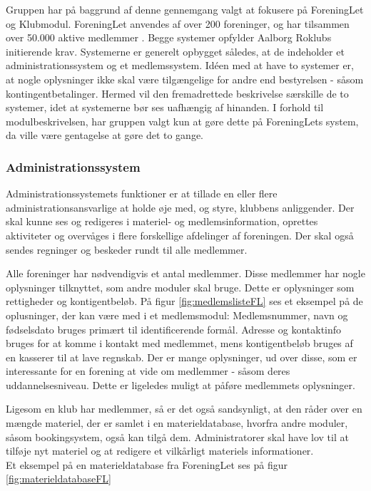 Gruppen har på baggrund af denne gennemgang valgt at fokusere på ForeningLet og Klubmodul. ForeningLet anvendes af over 200 foreninger, og har tilsammen over 50.000 aktive medlemmer \cite{ForeningLet}. Begge systemer opfylder Aalborg Roklubs initierende krav. Systemerne er generelt opbygget således, at de indeholder et administrationssystem og et medlemssystem. Idéen med at have to systemer er, at nogle oplysninger ikke skal være tilgængelige for andre end bestyrelsen - såsom kontingentbetalinger. Hermed vil den fremadrettede beskrivelse særskille de to systemer, idet at systemerne bør ses uafhængig af hinanden. I forhold til modulbeskrivelsen, har gruppen valgt kun at gøre dette på ForeningLets system, da ville være gentagelse at gøre det to gange.

\subsubsection{Administrationssystem}
Administrationssystemets funktioner er at tillade en eller flere administrationsansvarlige at holde øje med, og styre, klubbens anliggender. Der skal kunne ses og redigeres i materiel- og medlemsinformation, oprettes aktiviteter og overvåges i flere forskellige afdelinger af foreningen. Der skal også sendes regninger og beskeder rundt til alle medlemmer.

Alle foreninger har nødvendigvis et antal medlemmer. Disse medlemmer har nogle oplysninger tilknyttet, som andre moduler skal bruge. Dette er oplysninger som rettigheder og kontigentbeløb. På figur \ref{fig:medlemslisteFL} ses et eksempel på de oplusninger, der kan være med i et medlemsmodul:
Medlemsnummer, navn og fødselsdato bruges primært til identificerende formål. Adresse og kontaktinfo bruges for at komme i kontakt med medlemmet, mens kontigentbeløb bruges af en kasserer til at lave regnskab.
Der er mange oplysninger, ud over disse, som er interessante for en forening at vide om medlemmer - såsom deres uddannelsesniveau. Dette er ligeledes muligt at påføre medlemmets oplysninger.

Ligesom en klub har medlemmer, så er det også sandsynligt, at den råder over en mængde materiel, der er samlet i en materieldatabase, hvorfra andre moduler, såsom bookingsystem, også kan tilgå dem. Administratorer skal have lov til at tilføje nyt materiel og at redigere et vilkårligt materiels informationer.\\
Et eksempel på en materieldatabase fra ForeningLet\cite{ForeningLet} ses på figur \ref{fig:materieldatabaseFL}

